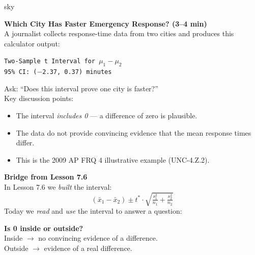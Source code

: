 \documentclass[10pt]{article}
\begin{document}
\begin{skillbox}[Hook]{sky}
\begin{minipage}[t]{0.55\linewidth}
    \textbf{Which City Has Faster Emergency Response? (3--4 min)}\\
    A journalist collects response-time data from two cities and produces this calculator
    output:
    \begin{center}
    \texttt{Two-Sample t Interval for $\mu_1 - \mu_2$}\\
    \texttt{95\% CI: ($-$2.37, 0.37) minutes}
    \end{center}
    Ask: ``Does this interval prove one city is faster?''\\[4pt]
    Key discussion points:
    \begin{itemize}
        \item The interval \emph{includes 0} --- a difference of zero is plausible.
        \item The data do not provide convincing evidence that the mean response times differ.
        \item This is the 2009 AP FRQ 4 illustrative example (UNC-4.Z.2).
    \end{itemize}
\end{minipage}
\hfill
\begin{minipage}[t]{0.40\linewidth}
    \textbf{Bridge from Lesson 7.6}\\
    In Lesson 7.6 we \emph{built} the interval:
    \[(\bar x_1 - \bar x_2) \pm t^* \cdot \sqrt{\tfrac{s_1^2}{n_1} + \tfrac{s_2^2}{n_2}}\]
    Today we \emph{read} and \emph{use} the interval to answer a question:\\[4pt]
    \begin{center}
    \textbf{Is 0 inside or outside?}\\
    Inside $\to$ no convincing evidence of a difference.\\
    Outside $\to$ evidence of a real difference.
    \end{center}
\end{minipage}
\end{skillbox}
\end{document}
